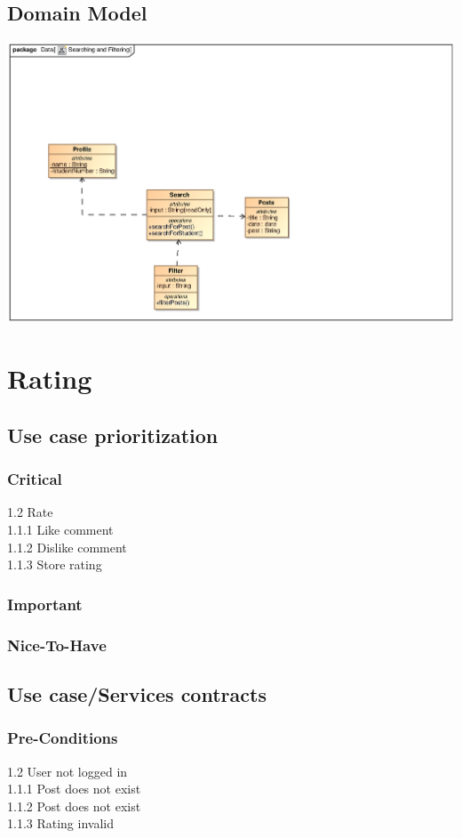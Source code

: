 \documentclass{scrreprt}
\begin{document}
\section{Domain Model} 
\includegraphics[scale=.9]{graphics/searchAndFilterUML.eps}\\

\chapter{Rating}
\section{Use case prioritization}
\subsection{Critical}
1.2	Rate\\
1.1.1 Like comment\\
1.1.2 Dislike comment\\
1.1.3 Store rating\\

\subsection{Important}

\subsection{Nice-To-Have}

\section{Use case/Services contracts}
\subsection{Pre-Conditions}								%
1.2	User not logged in\\
1.1.1 Post does not exist\\
1.1.2 Post does not exist\\
1.1.3 Rating invalid\\
\end{document}
